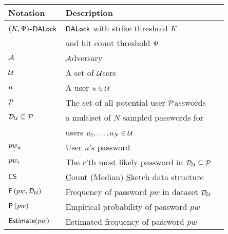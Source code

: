 \begin{table}[htb]
	\vspace{-0.2cm}
	\begin{tabular}{|l|l|l|}\hline
		
		Notation      & Description                                                                   \\\hline
		
		$(K, \Psi)$-$\mathsf{DALock}$  & $\mathsf{DALock}$ with strike threshold $K$                 \\        
		& and hit count threshold $\Psi$    \\\hline
		$\mathcal{A}$  & \underline{$\mathcal{A}$}dversary                            \\\hline
		
		$\mathcal{U}$ & A set of {$\mathcal{U}$}sers           \\\hline
		
		$u$           & A user  $u \in \mathcal{U}$                                                    \\\hline
		
		$\mathcal{P}$ & The set of all potential user \underline{$\mathcal{P}$}asswords \\\hline
		
		$\mathcal{D}_{{\mathcal{U}}} \subseteq \mathcal{P}$ & a multiset of $N$ sampled passwords  for\\
		
		& users $u_1,\ldots,u_N \in \mathcal{U}$ \\ \hline
		
		$pw_{u}$         & User $u$'s password   \\\hline
		
		$pw_{r}$         & The $r$'th most likely password in $\mathcal{D}_{{\mathcal{U}}} \subseteq \mathcal{P}$ \\\hline
		
		$\mathsf{CS}$ & \underline{C}ount (Median) \underline{S}ketch data structure\\    \hline    	
		
		$\mathsf{F}\left(pw, \mathcal{D}_{{\mathcal{U}}}\right)$ & Frequency of password $pw$ in dataset $\mathcal{D}_{{\mathcal{U}}}$ \\\hline
		
		$\mathsf{P}\left(pw\right)$ & Empirical probability of password $pw$  \\\hline        
		
		$\textsf{Estimate}(pw)$ & Estimated frequency of password $pw$\\\hline
		

\end{tabular}
\end{table}
